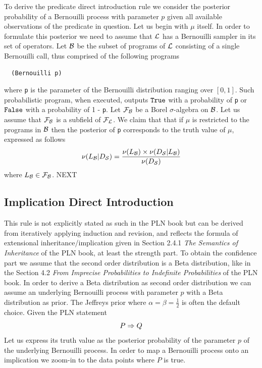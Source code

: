 \documentclass[]{article}
\begin{document}
To derive the predicate direct introduction rule we consider the
posterior probability of a Bernouilli process with parameter $p$ given
all available observations of the predicate in question.  Let us begin
with $\mu$ itself.  In order to formulate this posterior we need to
assume that $\mathcal{L}$ has a Bernouilli sampler in its set of
operators.  Let $\mathcal{B}$ be the subset of programs of $\mathcal{L}$
consisting of a single Bernouilli call, thus comprised of the
following programs
\begin{verbatim}
  (Bernouilli p)
\end{verbatim}
where \texttt{p} is the parameter of the Bernouilli
distribution ranging over $[0, 1]$.  Such probabilistic program, when
executed, outputs $\texttt{True}$ with a probability of \texttt{p} or
$\texttt{False}$ with a probability of 1 - \texttt{p}.  Let
$\mathcal{F}_{\mathcal{B}}$ be a Borel $\sigma$-algebra on $\mathcal{B}$.
Let us assume that $\mathcal{F}_{\mathcal{B}}$ is a subfield of
$\mathcal{F}_{\mathcal{L}}$.  We claim that that if $\mu$ is restricted to
the programs in $\mathcal{B}$ then the posterior of
\texttt{p} corresponds to the truth value of $\mu$,
expressed as follows
$$\nu(L_{\mathcal{B}} | D_{\mathcal{S}}) = \frac{\nu(L_{\mathcal{B}}) \times
  \nu(D_{\mathcal{S}} | L_{\mathcal{B}})}{\nu(D_{\mathcal{S}})}$$ where $L_{\mathcal{B}}
\in \mathcal{F}_{\mathcal{B}}$.  NEXT

\subsection{Implication Direct Introduction}
\label{sec:impldirect}
This rule is not explicitly stated as such in the PLN book but can be
derived from iteratively applying induction and revision, and reflects
the formula of extensional inheritance/implication given in Section
2.4.1 \emph{The Semantics of Inheritance} of the PLN book, at least
the strength part.  To obtain the confidence part we assume that the
second order distribution is a Beta distribution, like in the Section
4.2 \emph{From Imprecise Probabilities to Indefinite Probabilities} of
the PLN book.  In order to derive a Beta distribution as second order
distribution we can assume an underlying Bernouilli process with
parameter $p$ with a Beta distribution as prior.  The Jeffreys prior
where $\alpha=\beta=\frac{1}{2}$ is often the default choice.  Given
the PLN statement
$$P \Rightarrow Q$$ Let us express its truth value as the posterior
probability of the parameter $p$ of the underlying Bernouilli process.
In order to map a Bernouilli process onto an implication we zoom-in to
the data points where $P$ is true.
\end{document}
